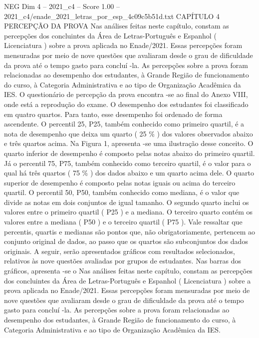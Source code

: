 \begin{textsample}{NEG Dim 4 – 2021\_c4 – Score 1.00 – 2021\_c4/enade\_2021\_letras\_por\_esp\_4c09c5b51d.txt}  \label{ex:f4_neg_228}
CAPÍTULO 4 PERCEPÇÃO DA PROVA Nas análises feitas neste capítulo, constam as percepções dos concluintes da Área de Letras-Português e Espanhol ( Licenciatura ) sobre a prova aplicada no Enade/2021.
Essas percepções foram mensuradas por meio de nove questões que avaliaram desde o grau de dificuldade da prova até o tempo gasto para concluí -la.
As percepções sobre a prova foram relacionadas ao desempenho dos estudantes, à Grande Região de funcionamento do curso, à Categoria Administrativa e ao tipo de Organização Acadêmica da IES.
O questionário de percepção da prova encontra -se ao final do Anexo VIII, onde está a reprodução do exame.
O desempenho dos estudantes foi classificado em quatro quartos.
Para tanto, esse desempenho foi ordenado de forma ascendente.
O percentil 25, P25, também conhecido como primeiro quartil, é a nota de desempenho que deixa um quarto ( 25 \% ) dos valores observados abaixo e três quartos acima.
Na Figura 1, apresenta -se uma ilustração desse conceito.
O quarto inferior de desempenho é composto pelas notas abaixo do primeiro quartil.
Já o percentil 75, P75, também conhecido como terceiro quartil, é o valor para o qual há três quartos ( 75 \% ) dos dados abaixo e um quarto acima dele.
O quarto superior de desempenho é composto pelas notas iguais ou acima do terceiro quartil.
O percentil 50, P50, também conhecido como mediana, é o valor que divide as notas em dois conjuntos de igual tamanho.
O segundo quarto inclui os valores entre o primeiro quartil ( P25 ) e a mediana.
O terceiro quarto contém os valores entre a mediana ( P50 ) e o terceiro quartil ( P75 ).
Vale ressaltar que percentis, quartis e medianas são pontos que, não obrigatoriamente, pertencem ao conjunto original de dados, ao passo que os quartos são subconjuntos dos dados originais.
A seguir, serão apresentados gráficos com resultados selecionados, relativos às nove questões avaliadas por grupos de estudantes.
Nas barras dos gráficos, apresenta -se o Nas análises feitas neste capítulo, constam as percepções dos concluintes da Área de Letras-Português e Espanhol ( Licenciatura ) sobre a prova aplicada no Enade/2021.
Essas percepções foram mensuradas por meio de nove questões que avaliaram desde o grau de dificuldade da prova até o tempo gasto para concluí -la.
As percepções sobre a prova foram relacionadas ao desempenho dos estudantes, à Grande Região de funcionamento do curso, à Categoria Administrativa e ao tipo de Organização Acadêmica da IES.

\end{textsample}
